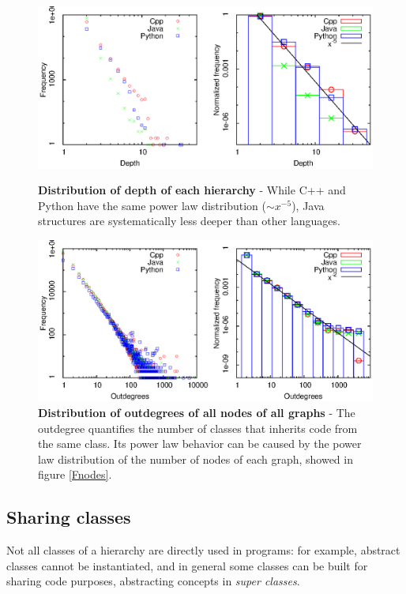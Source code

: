 \begin{figure}[p]%
\includegraphics[width=\textwidth,draft=false]{grafici/fDdepth.eps}
\caption{\label{Fdepth} \footnotesize\textbf{Distribution of depth of each hierarchy} - While C++ and Python have the same power law distribution ($\sim x^{-5}$), Java structures are systematically less deeper than other languages.}
\vspace{1cm}
\includegraphics[width=\textwidth,draft=false]{grafici/fDoutdeg.eps}
\caption{\label{Foutdeg} \footnotesize\textbf{Distribution of outdegrees of all nodes of all graphs} - The outdegree quantifies the number of classes that inherits code from the same class. Its power law behavior can be caused by the power law distribution of the number of nodes of each graph, showed in figure \ref{Fnodes}. }
\end{figure}

\subsection{Sharing classes}
Not all classes of a hierarchy are directly used in programs: for example, abstract classes cannot be instantiated, and in general some classes can be built for sharing code purposes, abstracting concepts in \textit{super classes}.

